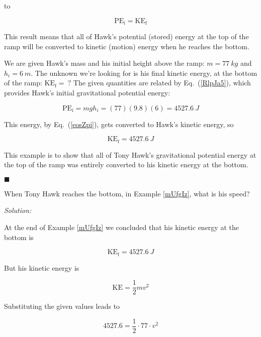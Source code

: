 \documentclass[dvipsnames]{article}
\begin{document}
to

\begin{equation} \label{eosZpi}
    \mathrm{PE_i} = \mathrm{KE_f}
\end{equation}

This result means that all of Hawk's potential (stored) energy at the top of the ramp will be converted to kinetic (motion) energy when he reaches the bottom.

We are given Hawk's mass and his initial height above the ramp: $m = \SI{77}{kg}$ and $h_i = \SI{6}{m}$. The unknown we're looking for is his final kinetic energy, at the bottom of the ramp: $\mathrm{KE_f} =\ ?$ The given quantities are related by Eq.~(\ref{RlpJa5}), which provides Hawk's initial gravitational potential energy:

\begin{equation*}
    \mathrm{PE_i} = mgh_i = (77)(9.8)(6) = \SI{4527.6}{J} 
\end{equation*}

This energy, by Eq.~(\ref{eosZpi}), gets converted to Hawk's kinetic energy, so

\begin{equation*}
    \mathrm{KE_f} = \SI{4527.6}{J} 
\end{equation*}

This example is to show that all of Tony Hawk's gravitational potential energy at the top of the ramp was entirely converted to his kinetic energy at the bottom.

\hfill $\blacksquare$


\begin{example} \label{nQVUKM}
When Tony Hawk reaches the bottom, in Example \ref{mUfgIz}, what is his speed?
\end{example} 

\textit{Solution:} 

At the end of Example \ref{mUfgIz} we concluded that his kinetic energy at the bottom is 

\begin{equation*}
    \mathrm{KE_f} = \SI{4527.6}{J}
\end{equation*}

But his kinetic energy is

\begin{equation*}
    \mathrm{KE} = \frac{1}{2} m v^2
\end{equation*}

Substituting the given values leads to 

\begin{equation*}
    4527.6 = \frac{1}{2} \cdot 77 \cdot v^2
\end{equation*}
\end{document}
